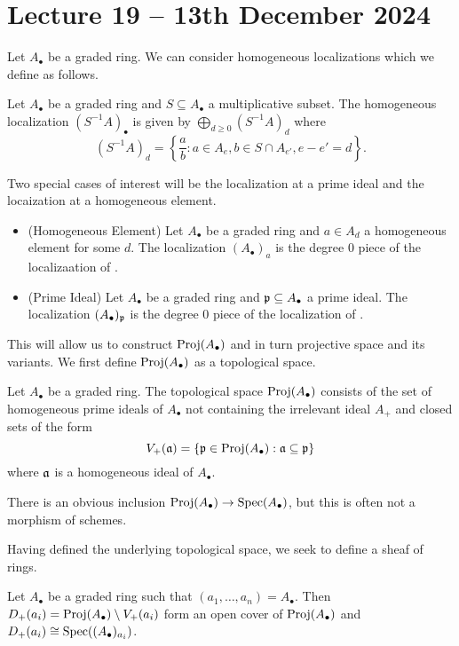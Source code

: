 \section{Lecture 19 -- 13th December 2024}\label{sec: lecture 19}
Let $A_{\bullet}$ be a graded ring. We can consider homogeneous localizations which we define as follows. 
\begin{definition}\label{def: homogeneous localization}
    Let $A_{\bullet}$ be a graded ring and $S\subseteq A_{\bullet}$ a multiplicative subset. The homogeneous localization $(S^{-1}A)_{\bullet}$ is given by $\bigoplus_{d\geq0}(S^{-1}A)_{d}$ where 
    $$(S^{-1}A)_{d}=\left\{\frac{a}{b}: a\in A_{e}, b\in S\cap A_{e'}, e-e'=d\right\}.$$
\end{definition}
Two special cases of interest will be the localization at a prime ideal and the locaization at a homogeneous element. 
\begin{itemize}
    \item (Homogeneous Element) Let $A_{\bullet}$ be a graded ring and $a\in A_{d}$ a homogeneous element for some $d$. The localization $(A_{\bullet})_{a}$ is the degree 0 piece of the localizaation of .
    \item (Prime Ideal) Let $A_{\bullet}$ be a graded ring and $\mathfrak{p}\subseteq A_{\bullet}$ a prime ideal. The localization $(A_{\bullet})_{\mathfrak{p}}$ is the degree 0 piece of the localization of . 
\end{itemize}
This will allow us to construct $\operatorname{Proj}(A_{\bullet})$ and in turn projective space and its variants. We first define $\operatorname{Proj}(A_{\bullet})$ as a topological space. 
\begin{definition}\label{def: proj space}
    Let $A_{\bullet}$ be a graded ring. The topological space $\operatorname{Proj}(A_{\bullet})$ consists of the set of homogeneous prime ideals of $A_{\bullet}$ not containing the irrelevant ideal $A_{+}$ and closed sets of the form 
    $$V_{+}(\mathfrak{a})=\{\mathfrak{p}\in\operatorname{Proj}(A_{\bullet}):\mathfrak{a}\subseteq\mathfrak{p}\}$$
    where $\mathfrak{a}$ is a homogeneous ideal of $A_{\bullet}$. 
\end{definition}
\begin{remark}
    There is an obvious inclusion $\operatorname{Proj}(A_{\bullet})\to\operatorname{Spec}(A_{\bullet})$, but this is often not a morphism of schemes. 
\end{remark}
Having defined the underlying topological space, we seek to define a sheaf of rings. 
\begin{proposition}\label{prop: covering of proj}
    Let $A_{\bullet}$ be a graded ring such that $(a_{1},\dots,a_{n})=A_{\bullet}$. Then $D_{+}(a_{i})=\operatorname{Proj}(A_{\bullet})\setminus V_{+}(a_{i})$ form an open cover of $\operatorname{Proj}(A_{\bullet})$ and $D_{+}(a_{i})\cong\operatorname{Spec}((A_{\bullet})_{a_{i}})$. 
\end{proposition}
